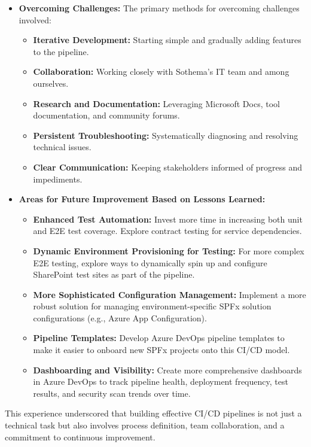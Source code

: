 \begin{itemize}
    \item \textbf{Overcoming Challenges:} The primary methods for overcoming challenges involved:
    \begin{itemize}
        \item \textbf{Iterative Development:} Starting simple and gradually adding features to the pipeline.
        \item \textbf{Collaboration:} Working closely with Sothema's IT team and among ourselves.
        \item \textbf{Research and Documentation:} Leveraging Microsoft Docs, tool documentation, and community forums.
        \item \textbf{Persistent Troubleshooting:} Systematically diagnosing and resolving technical issues.
        \item \textbf{Clear Communication:} Keeping stakeholders informed of progress and impediments.
    \end{itemize}
    \item \textbf{Areas for Future Improvement Based on Lessons Learned:}
    \begin{itemize}
        \item \textbf{Enhanced Test Automation:} Invest more time in increasing both unit and E2E test coverage. Explore contract testing for service dependencies.
        \item \textbf{Dynamic Environment Provisioning for Testing:} For more complex E2E testing, explore ways to dynamically spin up and configure SharePoint test sites as part of the pipeline.
        \item \textbf{More Sophisticated Configuration Management:} Implement a more robust solution for managing environment-specific SPFx solution configurations (e.g., Azure App Configuration).
        \item \textbf{Pipeline Templates:} Develop Azure DevOps pipeline templates to make it easier to onboard new SPFx projects onto this CI/CD model.
        \item \textbf{Dashboarding and Visibility:} Create more comprehensive dashboards in Azure DevOps to track pipeline health, deployment frequency, test results, and security scan trends over time.
    \end{itemize}
\end{itemize}

This experience underscored that building effective CI/CD pipelines is not just a technical task but also involves process definition, team collaboration, and a commitment to continuous improvement.
